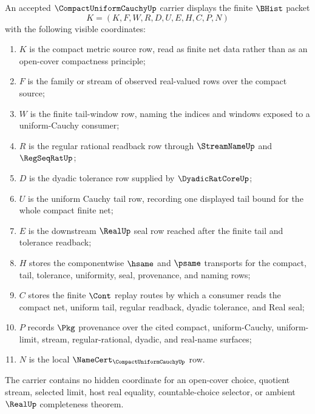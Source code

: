\begin{definition}
\label{def:compact-uniform-cauchy-carrier}
An accepted $\CompactUniformCauchyUp$ carrier displays the finite $\BHist$ packet
$$
K=(K,F,W,R,D,U,E,H,C,P,N)
$$
with the following visible coordinates:
\begin{enumerate}
\item $K$ is the compact metric source row, read as finite net data rather than as an open-cover compactness principle;
\item $F$ is the family or stream of observed real-valued rows over the compact source;
\item $W$ is the finite tail-window row, naming the indices and windows exposed to a uniform-Cauchy consumer;
\item $R$ is the regular rational readback row through $\StreamNameUp$ and $\RegSeqRatUp$;
\item $D$ is the dyadic tolerance row supplied by $\DyadicRatCoreUp$;
\item $U$ is the uniform Cauchy tail row, recording one displayed tail bound for the whole compact finite net;
\item $E$ is the downstream $\RealUp$ seal row reached after the finite tail and tolerance readback;
\item $H$ stores the componentwise $\hsame$ and $\psame$ transports for the compact, tail, tolerance, uniformity, seal, provenance, and naming rows;
\item $C$ stores the finite $\Cont$ replay routes by which a consumer reads the compact net, uniform tail, regular readback, dyadic tolerance, and Real seal;
\item $P$ records $\Pkg$ provenance over the cited compact, uniform-Cauchy, uniform-limit, stream, regular-rational, dyadic, and real-name surfaces;
\item $N$ is the local $\NameCert_{\CompactUniformCauchyUp}$ row.
\end{enumerate}
The carrier contains no hidden coordinate for an open-cover choice, quotient stream, selected limit, host real equality, countable-choice selector, or ambient $\RealUp$ completeness theorem.
\end{definition}

